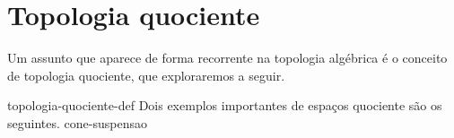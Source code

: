 \section{Topologia quociente}
\label{topologia-quociente}
Um assunto que aparece de forma recorrente na topologia algébrica é o conceito de topologia quociente, que exploraremos a seguir. 

{topologia-quociente-def}%
Dois exemplos importantes de espaços quociente são os seguintes.
{cone-suspensao}

